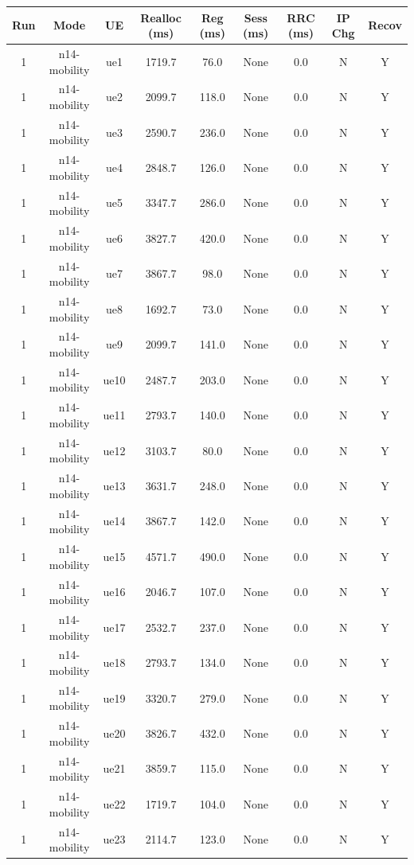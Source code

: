 \begin{table}[ht]
\centering
\begin{tabular}{|c|c|c|c|c|c|c|c|c|}
\hline
Run & Mode & UE & Realloc (ms) & Reg (ms) & Sess (ms) & RRC (ms) & IP Chg & Recov \\
\hline
1 & n14-mobility & ue1 & 1719.7 & 76.0 & None & 0.0 & N & Y \\
1 & n14-mobility & ue2 & 2099.7 & 118.0 & None & 0.0 & N & Y \\
1 & n14-mobility & ue3 & 2590.7 & 236.0 & None & 0.0 & N & Y \\
1 & n14-mobility & ue4 & 2848.7 & 126.0 & None & 0.0 & N & Y \\
1 & n14-mobility & ue5 & 3347.7 & 286.0 & None & 0.0 & N & Y \\
1 & n14-mobility & ue6 & 3827.7 & 420.0 & None & 0.0 & N & Y \\
1 & n14-mobility & ue7 & 3867.7 & 98.0 & None & 0.0 & N & Y \\
1 & n14-mobility & ue8 & 1692.7 & 73.0 & None & 0.0 & N & Y \\
1 & n14-mobility & ue9 & 2099.7 & 141.0 & None & 0.0 & N & Y \\
1 & n14-mobility & ue10 & 2487.7 & 203.0 & None & 0.0 & N & Y \\
1 & n14-mobility & ue11 & 2793.7 & 140.0 & None & 0.0 & N & Y \\
1 & n14-mobility & ue12 & 3103.7 & 80.0 & None & 0.0 & N & Y \\
1 & n14-mobility & ue13 & 3631.7 & 248.0 & None & 0.0 & N & Y \\
1 & n14-mobility & ue14 & 3867.7 & 142.0 & None & 0.0 & N & Y \\
1 & n14-mobility & ue15 & 4571.7 & 490.0 & None & 0.0 & N & Y \\
1 & n14-mobility & ue16 & 2046.7 & 107.0 & None & 0.0 & N & Y \\
1 & n14-mobility & ue17 & 2532.7 & 237.0 & None & 0.0 & N & Y \\
1 & n14-mobility & ue18 & 2793.7 & 134.0 & None & 0.0 & N & Y \\
1 & n14-mobility & ue19 & 3320.7 & 279.0 & None & 0.0 & N & Y \\
1 & n14-mobility & ue20 & 3826.7 & 432.0 & None & 0.0 & N & Y \\
1 & n14-mobility & ue21 & 3859.7 & 115.0 & None & 0.0 & N & Y \\
1 & n14-mobility & ue22 & 1719.7 & 104.0 & None & 0.0 & N & Y \\
1 & n14-mobility & ue23 & 2114.7 & 123.0 & None & 0.0 & N & Y \\

\end{tabular}
\end{table}
